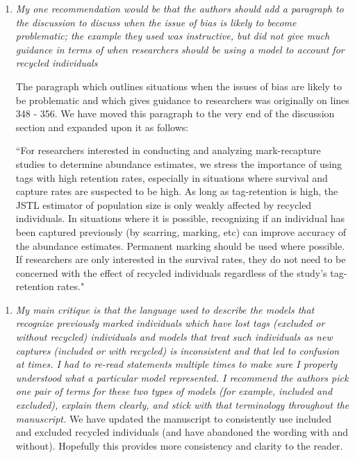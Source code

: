 \documentclass[12pt]{article}
\begin{document}
\begin{enumerate}
\item  {\it My one recommendation would be that the authors should add a paragraph to the discussion to discuss when the issue of bias is likely to become problematic;  the example they used was instructive,  but did not give much guidance in terms of when researchers should be using a model to account for recycled individuals}

The paragraph which outlines situations when the issues of bias are likely to be problematic and which gives guidance to researchers was originally on lines 348 - 356. We have moved this paragraph to the very end of the discussion section and expanded upon it as follows: 

``For researchers interested in conducting and analyzing mark-recapture
studies to determine abundance estimates, we stress the importance of using tags with high retention
rates, especially in situations where survival and capture rates are
suspected to be high. As long as tag-retention is high, the JSTL
estimator of population size is only weakly affected by recycled individuals. In
situations where it is possible, recognizing if an individual has been
captured previously (by scarring, marking, etc) can improve accuracy of the
abundance estimates. Permanent marking should be used where possible. If
researchers are only interested in the survival rates, they do not need
to be concerned with the effect of recycled individuals regardless of
the study's tag-retention rates."

\end{enumerate}

\begin{enumerate}
\item  {\it My main critique is that the language used to describe the models that recognize previously marked individuals which have lost tags (excluded or without recycled) individuals and models that treat such individuals as new captures (included or with recycled) is inconsistent and that led to confusion at times. I had to re-read statements multiple times to make sure I properly understood what a particular model represented. I recommend the authors pick one pair of terms for these two types of models (for example, included and excluded), explain them clearly, and stick with that terminology throughout the manuscript.}
We have updated the manuscript to consistently use included and excluded recycled individuals (and have abandoned the wording with and without). Hopefully this provides more consistency and clarity to the reader.
\end{enumerate}
\end{document}
